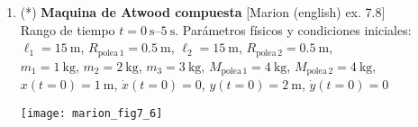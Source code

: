 \documentclass[11pt, spanish, a4paper, twoside]{article}
\begin{document}
\begin{enumerate}
\item
\begin{minipage}[t][6cm]{0.65\textwidth}
(*) \textbf{Maquina de Atwood compuesta} [Marion (english) ex. 7.8]\\ 
Rango de tiempo \(t = \SIrange{0}{5}{\second}\).
Parámetros físicos y condiciones iniciales:\\
\(\ell_1 = \SI{15}{\metre}\), 
\(R_{\mathrm{polea}\,1} = \SI{0.5}{\metre}\), 
\(\ell_2 = \SI{15}{\metre}\), 
\(R_{\mathrm{polea}\,2} = \SI{0.5}{\metre}\),\\ 
\(m_1 = \SI{1}{\kilo\gram}\),
\(m_2 = \SI{2}{\kilo\gram}\),
\(m_3 = \SI{3}{\kilo\gram}\),
\(M_{\mathrm{polea}\,1} = \SI{4}{\kilo\gram}\),
\(M_{\mathrm{polea}\,2} = \SI{4}{\kilo\gram}\),\\
\(x(t=0) = \SI{1}{\metre}\), \(\dot{x}(t=0) = 0\),
\(y(t=0) = \SI{2}{\metre}\), \(\dot{y}(t=0) = 0\)
\end{minipage}
\begin{minipage}[c][0cm][t]{0.3\textwidth}
	\texttt{[image: marion\_fig7\_6]}
\end{minipage}




\end{enumerate}
\end{document}
